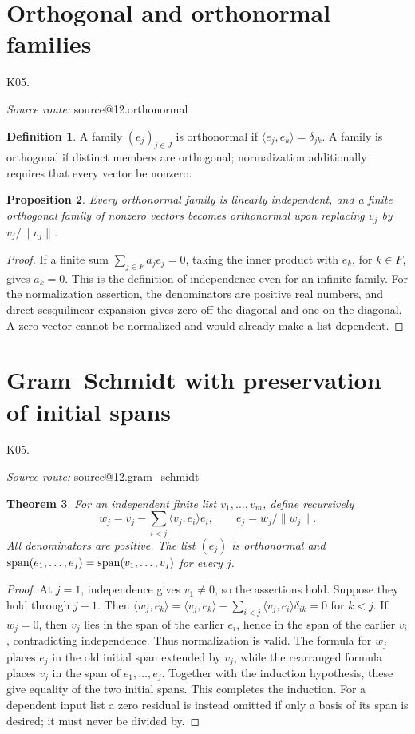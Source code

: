 \documentclass[11pt,a4paper]{book}
\makeatletter
\newtheorem{theorem}{Theorem}[chapter]
\newtheorem{proposition}[theorem]{Proposition}
\theoremstyle{definition}\newtheorem{definition}[theorem]{Definition}
\theoremstyle{remark}\newtheorem{remark}[theorem]{Remark}
\newcommand{\ip}[2]{\langle #1,#2\rangle}
\newcommand{\norm}[1]{\lVert #1\rVert}
\newcommand{\Kentry}[2]{\section{#2}\label{k:#1}\noindent\textsf{\small K05.\detokenize{#1}}\par
  \begingroup\small\color{black!65}\textit{Source route: }\csname source@#1\endcsname\par\endgroup}
\makeatother
\begin{document}
\Kentry{12.orthonormal}{Orthogonal and orthonormal families}
\begin{definition}
A family $(e_j)_{j\in J}$ is orthonormal if $\ip{e_j}{e_k}=\delta_{jk}$. A family is orthogonal if distinct members are orthogonal; normalization additionally requires that every vector be nonzero.
\end{definition}
\begin{proposition}
Every orthonormal family is linearly independent, and a finite orthogonal family of nonzero vectors becomes orthonormal upon replacing $v_j$ by $v_j/\norm{v_j}$.
\end{proposition}
\begin{proof}
If a finite sum $\sum_{j\in F}a_j e_j=0$, taking the inner product with $e_k$, for $k\in F$, gives $a_k=0$. This is the definition of independence even for an infinite family. For the normalization assertion, the denominators are positive real numbers, and direct sesquilinear expansion gives zero off the diagonal and one on the diagonal. A zero vector cannot be normalized and would already make a list dependent.
\end{proof}

\Kentry{12.gram_schmidt}{Gram--Schmidt with preservation of initial spans}
\begin{theorem}
For an independent finite list $v_1,\ldots,v_m$, define recursively
\[
w_j=v_j-\sum_{i<j}\ip{v_j}{e_i}e_i,\qquad e_j=w_j/\norm{w_j}.
\]
All denominators are positive. The list $(e_j)$ is orthonormal and
$\operatorname{span}(e_1,\ldots,e_j)=\operatorname{span}(v_1,\ldots,v_j)$ for every $j$.
\end{theorem}
\begin{proof}
At $j=1$, independence gives $v_1\ne0$, so the assertions hold. Suppose they hold through $j-1$. Then
$\ip{w_j}{e_k}=\ip{v_j}{e_k}-\sum_{i<j}\ip{v_j}{e_i}\delta_{ik}=0$ for $k<j$. If $w_j=0$, then $v_j$ lies in the span of the earlier $e_i$, hence in the span of the earlier $v_i$, contradicting independence. Thus normalization is valid. The formula for $w_j$ places $e_j$ in the old initial span extended by $v_j$, while the rearranged formula places $v_j$ in the span of $e_1,\ldots,e_j$. Together with the induction hypothesis, these give equality of the two initial spans. This completes the induction. For a dependent input list a zero residual is instead omitted if only a basis of its span is desired; it must never be divided by.
\end{proof}
\end{document}
